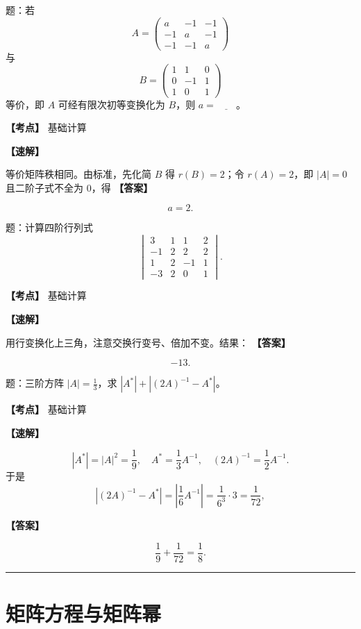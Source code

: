﻿\documentclass[11pt,a4paper,UTF8]{ctexart}
\begin{document}
\begin{answerbox}[2023--2024 填空 2]
题：若
\[
A=\begin{pmatrix}a&-1&-1\\-1&a&-1\\-1&-1&a\end{pmatrix}
\]
与
\[
B=\begin{pmatrix}1&1&0\\0&-1&1\\1&0&1\end{pmatrix}
\]
等价，即 $A$ 可经有限次初等变换化为 $B$，则 $a=\underline{\qquad}$。

\textbf{【考点】} 基础计算

\textbf{【速解】}

等价矩阵秩相同。由标准，先化简 $B$ 得 $r(B)=2$；令 $r(A)=2$，即 $|A|=0$ 且二阶子式不全为 $0$，得
\textbf{【答案】}

\[a=2.\]
\end{answerbox}
\begin{answerbox}[2024--2025 填空 1]
题：计算四阶行列式
\[
\begin{vmatrix}
3&1&1&2\\
-1&2&2&2\\
1&2&-1&1\\
-3&2&0&1
\end{vmatrix}.
\]

\textbf{【考点】} 基础计算

\textbf{【速解】}

用行变换化上三角，注意交换行变号、倍加不变。结果：
\textbf{【答案】}

\[-13.\]
\end{answerbox}
\begin{answerbox}[2024--2025 填空 2]
题：三阶方阵 $|A|=\frac13$，求 $|A^*|+|(2A)^{-1}-A^*|$。

\textbf{【考点】} 基础计算

\textbf{【速解】}

\[|A^*|=|A|^2=\frac19,\quad A^*=\frac13 A^{-1},\quad (2A)^{-1}=\frac12A^{-1}.\]
于是
\[|(2A)^{-1}-A^*|=\left|\frac16A^{-1}\right|=\frac1{6^3}\cdot 3=\frac1{72},\]

\textbf{【答案】}

\[\frac19+\frac1{72}=\frac18.\]
\end{answerbox}
\bigskip\hrule\bigskip

\section{矩阵方程与矩阵幂}
\end{document}
